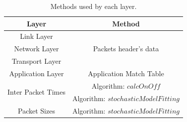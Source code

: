 \begin{table}[ht!]
	\centering
	\caption{Methods used by each layer.}
	\label{tab:methods}
	\begin{tabular}{cc}
		\hline
		Layer                               & Method                                 \\ \hline
		Link Layer                          & \multirow{3}{*}{Packets header's data} \\
		Network Layer                       &                                        \\
		Transport Layer                     &                                        \\
		Application Layer                   & Application Match Table                \\
		\multirow{2}{*}{Inter Packet Times} & Algorithm: $calcOnOff$                 \\
		& Algorithm: $stochasticModelFitting$    \\
		Packet Sizes                        & Algorithm: $stochasticModelFitting$    \\ \hline
	\end{tabular}
\end{table}







